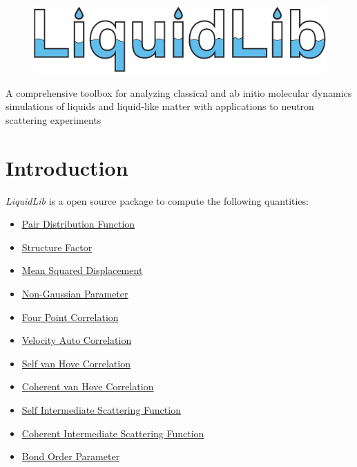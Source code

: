 \documentclass{article}
\begin{document}
	\begin{figure}
		\centering
		\includegraphics[width=.9\textwidth]{./images/LiquidLib_logo.pdf}
	\end{figure}
{
\centering
\Large A comprehensive toolbox for analyzing classical and ab initio molecular dynamics simulations of liquids and liquid-like matter with applications to neutron scattering experiments
}
\newpage

\section{Introduction}
\textit{LiquidLib} is a open source package to compute the following quantities:
\begin{itemize}
	\item \hyperref[sec::gofr]{Pair Distribution Function}
	\item \hyperref[sec::sofk]{Structure Factor}
	\item \hyperref[sec::MSD]{Mean Squared Displacement}
	\item \hyperref[sec::alpha2]{Non-Gaussian Parameter}
	\item \hyperref[sec::chi4]{Four Point Correlation}
	\item \hyperref[sec::VACF]{Velocity Auto Correlation}
	\item \hyperref[sec::Gofrt]{Self van Hove Correlation}
	\item \hyperref[sec::Grt]{Coherent van Hove Correlation}
	\item \hyperref[sec::Fsqt]{Self Intermediate Scattering Function}
	\item \hyperref[sec::Fqt]{Coherent Intermediate Scattering Function}
	\item \hyperref[sec::BOP]{Bond Order Parameter}
\end{itemize}
\end{document}
